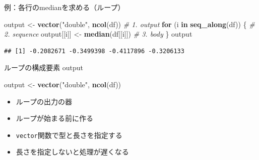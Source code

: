 \documentclass[ignorenonframetext,]{beamer}
\newenvironment{Shaded}{\begin{snugshade}}{\end{snugshade}}
\newcommand{\KeywordTok}[1]{\textcolor[rgb]{0.13,0.29,0.53}{\textbf{#1}}}
\newcommand{\StringTok}[1]{\textcolor[rgb]{0.31,0.60,0.02}{#1}}
\newcommand{\CommentTok}[1]{\textcolor[rgb]{0.56,0.35,0.01}{\textit{#1}}}
\newcommand{\ControlFlowTok}[1]{\textcolor[rgb]{0.13,0.29,0.53}{\textbf{#1}}}
\newcommand{\NormalTok}[1]{#1}
\providecommand{\tightlist}{%
  \setlength{\itemsep}{0pt}\setlength{\parskip}{0pt}}
\begin{document}
\begin{frame}[fragile]{例：各行のmedianを求める（ループ）}

\begin{Shaded}
\begin{Highlighting}[]
\NormalTok{output <-}\StringTok{ }\KeywordTok{vector}\NormalTok{(}\StringTok{"double"}\NormalTok{, }\KeywordTok{ncol}\NormalTok{(df))  }\CommentTok{# 1. output}
\ControlFlowTok{for}\NormalTok{ (i }\ControlFlowTok{in} \KeywordTok{seq_along}\NormalTok{(df)) \{            }\CommentTok{# 2. sequence}
\NormalTok{  output[[i]] <-}\StringTok{ }\KeywordTok{median}\NormalTok{(df[[i]])      }\CommentTok{# 3. body}
\NormalTok{\}}
\NormalTok{output}
\end{Highlighting}
\end{Shaded}

\begin{verbatim}
## [1] -0.2082671 -0.3499398 -0.4117896 -0.3206133
\end{verbatim}

\end{frame}

\begin{frame}[fragile]{ループの構成要素 output}

\begin{Shaded}
\begin{Highlighting}[]
\NormalTok{output <-}\StringTok{ }\KeywordTok{vector}\NormalTok{(}\StringTok{"double"}\NormalTok{, }\KeywordTok{ncol}\NormalTok{(df))}
\end{Highlighting}
\end{Shaded}

\begin{itemize}
\tightlist
\item
  ループの出力の器
\item
  ループが始まる前に作る
\item
  \texttt{vector}関数で型と長さを指定する
\item
  長さを指定しないと処理が遅くなる
\end{itemize}

\end{frame}
\end{document}
